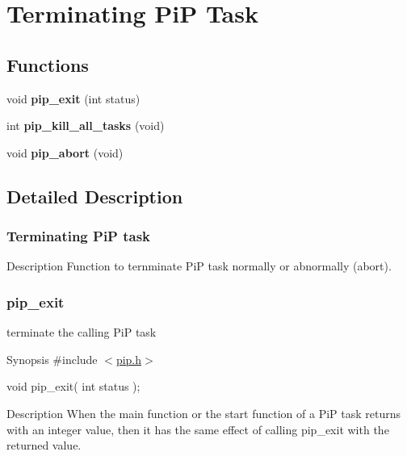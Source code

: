 \hypertarget{group__pip-2-exit}{\section{Terminating Pi\-P Task}
\label{group__pip-2-exit}
}
\subsection*{Functions}
\begin{DoxyCompactItemize}
\item 
\hypertarget{group__pip-2-exit_ga55171ea8db2c2693f005560e427485c2}{void {\bfseries pip\-\_\-exit} (int status)}\label{group__pip-2-exit_ga55171ea8db2c2693f005560e427485c2}

\item 
\hypertarget{group__pip-2-exit_gab7ba5cc62101240c68acf07905e36772}{int {\bfseries pip\-\_\-kill\-\_\-all\-\_\-tasks} (void)}\label{group__pip-2-exit_gab7ba5cc62101240c68acf07905e36772}

\item 
\hypertarget{group__pip-2-exit_ga49a4a9ee014ffdaf0c26df18adf965ad}{void {\bfseries pip\-\_\-abort} (void)}\label{group__pip-2-exit_ga49a4a9ee014ffdaf0c26df18adf965ad}

\end{DoxyCompactItemize}


\subsection{Detailed Description}
\hypertarget{pip-exit}{}\subsubsection{Terminating Pi\-P task}\label{pip-exit}
\begin{DoxyParagraph}{Description}
Function to ternminate Pi\-P task normally or abnormally (abort). 
\end{DoxyParagraph}
\hypertarget{pip_exit}{}\subsubsection{pip\-\_\-exit}\label{pip_exit}
terminate the calling Pi\-P task

\begin{DoxyParagraph}{Synopsis}
\#include $<$\hyperlink{pip_8h_source}{pip.\-h}$>$ \par
 void pip\-\_\-exit( int status );
\end{DoxyParagraph}
\begin{DoxyParagraph}{Description}
When the main function or the start function of a Pi\-P task returns with an integer value, then it has the same effect of calling {\ttfamily pip\-\_\-exit} with the returned value.
\end{DoxyParagraph}

